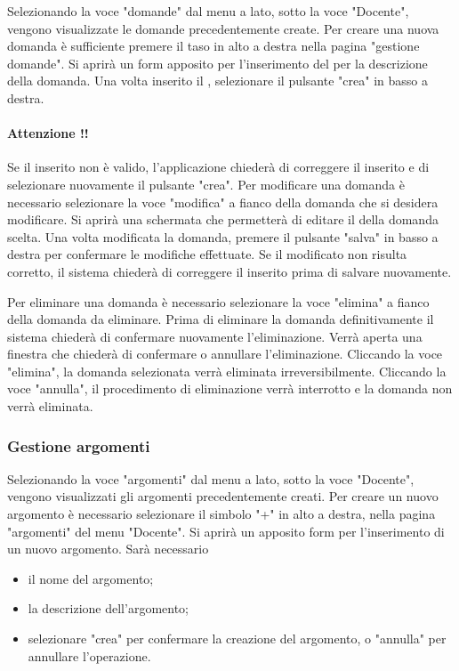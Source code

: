 \documentclass[12pt,a4paper]{article}
\begin{document}
    Selezionando la voce "domande" dal menu a lato, sotto la voce "Docente", vengono visualizzate le domande precedentemente create. 
	Per creare una nuova domanda è sufficiente premere il taso in alto a destra nella pagina "gestione domande". 
	Si aprirà un form apposito per l'inserimento del  per la descrizione della domanda.
	Una volta inserito il , selezionare il pulsante "crea" in basso a destra.
	
	\paragraph{Attenzione !!}Se il  inserito non è valido, l'applicazione chiederà di correggere il  inserito e di selezionare nuovamente il pulsante "crea".
	Per modificare una domanda è necessario selezionare la voce "modifica" a fianco della domanda che si desidera modificare. Si aprirà una schermata che permetterà di editare il  della domanda scelta.
	Una volta modificata la domanda, premere il pulsante "salva" in basso a destra per confermare le modifiche effettuate. 
	Se il  modificato non risulta corretto, il sistema chiederà di correggere il  inserito prima di salvare nuovamente.
	
	Per eliminare una domanda è necessario selezionare la voce "elimina" a fianco della domanda da eliminare. Prima di eliminare la domanda definitivamente il sistema chiederà di confermare nuovamente l'eliminazione.
	Verrà aperta una finestra che chiederà di confermare o annullare l'eliminazione. Cliccando la voce "elimina", la domanda selezionata verrà eliminata irreversibilmente. Cliccando la voce "annulla", il procedimento di eliminazione verrà interrotto e la domanda non verrà eliminata.
		
	\subsubsection{Gestione argomenti}
	Selezionando la voce "argomenti" dal menu a lato, sotto la voce "Docente", vengono visualizzati gli argomenti precedentemente creati.
		Per creare un nuovo argomento è necessario selezionare il simbolo "+" in alto a destra, nella pagina "argomenti" del menu "Docente".
		Si aprirà un apposito form per l'inserimento di un nuovo argomento.
		Sarà necessario 
			\begin{itemize}
			\item il nome del argomento;
			\item la descrizione dell'argomento;
			\item selezionare "crea" per confermare la creazione del argomento, o "annulla" per annullare l'operazione.
		\end{itemize}
		
\end{document}
